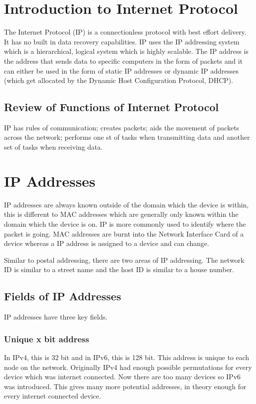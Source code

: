 
\section*{Introduction to Internet Protocol}
The Internet Protocol (IP) is a connectionless protocol with best effort delivery. It has no built in data recovery capabilities. IP uses the IP addressing system which is a hierarchical, logical system which is highly scalable. The IP address is the address that sends data to specific computers in the form of packets and it can either be used in the form of static IP addresses or dynamic IP addresses (which get allocated by the Dynamic Host Configuration Protocol, DHCP).

\subsection*{Review of Functions of Internet Protocol}
IP has rules of communication; creates packets; aids the movement of packets across the network; performs one st of tasks when transmitting data and another set of tasks when receiving data.

\section*{IP Addresses}
IP addresses are always known outside of the domain which the device is within, this is different to MAC addresses which are generally only known within the domain which the device is on. IP is more commonly used to identify where the packet is going. MAC addresses are burnt into the Network Interface Card of a device whereas a IP address is assigned to a device and can change. 

Similar to postal addressing, there are two areas of IP addressing. The network ID is similar to a street name and the host ID is similar to a house number. 
\subsection*{Fields of IP Addresses}
IP addresses have three key fields. 
\subsubsection*{Unique x bit address}
In IPv4, this is 32 bit and in IPv6, this is 128 bit. This address is unique to each node on the network. Originally IPv4 had enough possible permutations for every device which was internet connected. Now there are too many devices so IPv6 was introduced. This gives many more potential addresses, in theory enough for every internet connected device.
